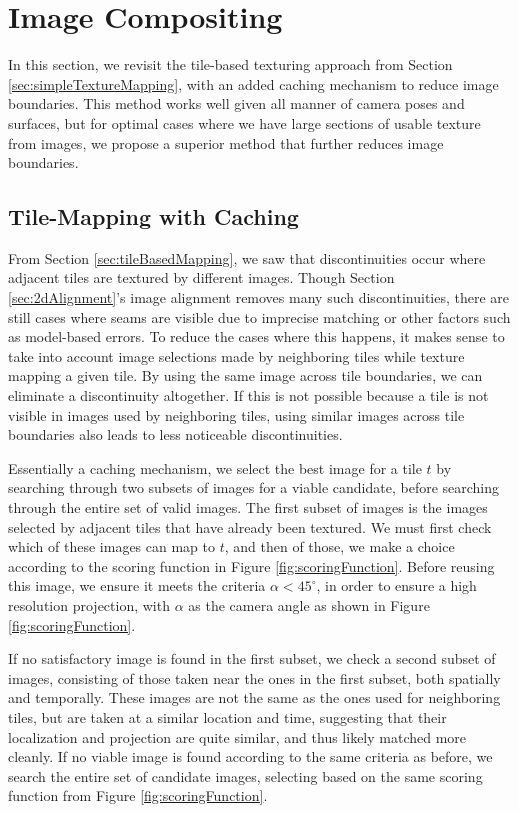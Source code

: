 \documentclass[]{spie}  %
\begin{document}
\section{Image Compositing}
\label{sec:imageCompositing}
In this section, we revisit the tile-based texturing approach from
Section \ref{sec:simpleTextureMapping}, with an added caching
mechanism to reduce image boundaries. This method works well given all
manner of camera poses and surfaces, but for optimal cases where we
have large sections of usable texture from images, we propose a
superior method that further reduces image boundaries.

\subsection{Tile-Mapping with Caching}
\label{sec:mappingWithCaching}
From Section \ref{sec:tileBasedMapping}, we saw that discontinuities
occur where adjacent tiles are textured by different images. Though
Section \ref{sec:2dAlignment}'s image alignment removes many such
discontinuities, there are still cases where seams are visible due to
imprecise matching or other factors such as model-based errors. To
reduce the cases where this happens, it makes sense to take into
account image selections made by neighboring tiles while texture
mapping a given tile. By using the same image across tile boundaries,
we can eliminate a discontinuity altogether. If this is not possible
because a tile is not visible in images used by neighboring tiles,
using similar images across tile boundaries also leads to less
noticeable discontinuities.

Essentially a caching mechanism, we select the best image for a tile
$t$ by searching through two subsets of images for a viable candidate,
before searching through the entire set of valid images. The first
subset of images is the images selected by adjacent tiles that have
already been textured. We must first check which of these images can
map to $t$, and then of those, we make a choice according to the
scoring function in Figure \ref{fig:scoringFunction}. Before reusing
this image, we ensure it meets the criteria $\alpha < 45^\circ$, in
order to ensure a high resolution projection, with $\alpha$ as the
camera angle as shown in Figure \ref{fig:scoringFunction}.

If no satisfactory image is found in the first subset, we check a
second subset of images, consisting of those taken near the ones in
the first subset, both spatially and temporally. These images are not
the same as the ones used for neighboring tiles, but are taken at a
similar location and time, suggesting that their localization and
projection are quite similar, and thus likely matched more cleanly. If
no viable image is found according to the same criteria as before, we
search the entire set of candidate images, selecting based on the same
scoring function from Figure \ref{fig:scoringFunction}.
\end{document}
